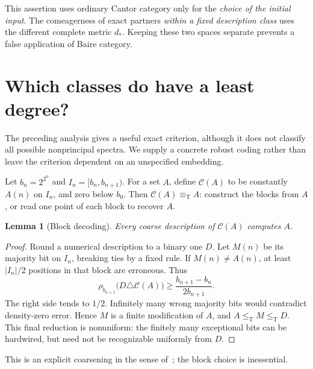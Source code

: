 \documentclass[11pt,a4paper]{article}
\newcommand{\leT}{\leq_{\mathrm T}}
\newcommand{\eqT}{\equiv_{\mathrm T}}
\newcommand{\dst}{d_{\!*}}
\newtheorem{lemma}[theorem]{Lemma}
\theoremstyle{definition}\newtheorem{definition}[theorem]{Definition}
\theoremstyle{remark}\newtheorem{remark}[theorem]{Remark}
\begin{document}
This assertion uses ordinary Cantor category only for the \emph{choice of the initial input}. The comeagerness of exact partners \emph{within a fixed description class} uses the different complete metric $\dst$. Keeping these two spaces separate prevents a false application of Baire category.

\section{Which classes do have a least degree?}
\label{sec:leastcriterion}
The preceding analysis gives a useful exact criterion, although it does not classify all possible nonprincipal spectra. We supply a concrete robust coding rather than leave the criterion dependent on an unspecified embedding.

Let $b_n=2^{2^n}$ and $I_n=[b_n,b_{n+1})$. For a set $A$, define $\mathcal C(A)$ to be constantly $A(n)$ on $I_n$, and zero below $b_0$. Then $\mathcal C(A)\eqT A$: construct the blocks from $A$, or read one point of each block to recover $A$.

\begin{lemma}[Block decoding]\label{lem:block}
Every coarse description of $\mathcal C(A)$ computes $A$.
\end{lemma}
\begin{proof}
Round a numerical description to a binary one $D$. Let $M(n)$ be its majority bit on $I_n$, breaking ties by a fixed rule. If $M(n)\ne A(n)$, at least $|I_n|/2$ positions in that block are erroneous. Thus
\[
 \rho_{b_{n+1}}\bigl(D\triangle\mathcal C(A)\bigr)
                  \ge\frac{b_{n+1}-b_n}{2b_{n+1}}.
\]
The right side tends to $1/2$. Infinitely many wrong majority bits would contradict density-zero error. Hence $M$ is a finite modification of $A$, and $A\leT M\leT D$. This final reduction is nonuniform: the finitely many exceptional bits can be hardwired, but need not be recognizable uniformly from $D$.
\end{proof}

This is an explicit coarsening in the sense of~\cite[Definition~2.1]{HJKS}; the block choice is inessential.
\end{document}
